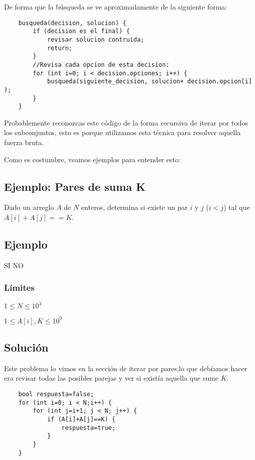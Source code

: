 De forma que la búsqueda se ve aproximadamente de la siguiente forma:

\begin{lstlisting}
	busqueda(decision, solucion) {
		if (decision es el final) {
			revisar solucion contruida;
			return;
		}		
		//Revisa cada opcion de esta decision:
		for (int i=0; i < decision.opciones; i++) {
			busqueda(siguiente_decision, solucion+ decision.opcion[i] );
		}
	}
\end{lstlisting}

Probablemente reconozcas este código de la forma recursiva de iterar por todos los subconjuntos, esto es porque utilizamos esta técnica para resolver aquella fuerza bruta.

Como es costumbre, veamos ejemplos para entender esto:
\subsection*{Ejemplo: Pares de suma K}
Dado un arreglo \(A\) de \(N\) enteros, determina si existe un par \(i\) y \(j\) (\(i<j\)) tal que \(A[i]+A[j]==K\).

\subsection*{Ejemplo}
\begin{casebox2}
	{SI}
	 {
		NO
	}
	
\end{casebox2}
\subsubsection*{Límites}
\begin{plimits}
	\item \(1\leq N \leq 10^3\)
	\item \(1\leq A[i], K \leq 10^9\)
\end{plimits}

\subsection*{Solución}
Este problema lo vimos en la sección de iterar por pares,lo que debíamos hacer era revisar todas las posibles parejas y ver si existía aquella que sume \(K\).

\begin{lstlisting}
	bool respuesta=false;
	for (int i=0; i < N;i++) {
		for (int j=i+1; j < N; j++) {
			if (A[i]+A[j]==K) {
				respuesta=true;
			}
		}
	}
\end{lstlisting}

